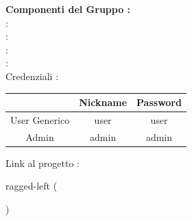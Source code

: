 \documentclass[12pt, a4paper,table]{article}
\begin{document}
\begin{center}
		\vspace{2em}
		\textbf{Componenti del Gruppo :}
		\vspace{0.5em}
		\\ \Tber : \MatT
		\vspace{0.5em}
		\\ \Mspa : \MatM
		\vspace{0.5em}
		\\ \Plau : \MatP
		\vspace{0.5em}
		\\ \Amat : \MatA
    \vspace{0.5em}
    \\ Credenziali :
    \begin{center}
      \begin{tabular}{ |c|c|c| } 
      \hline
      & Nickname & Password \\
      \hline
      User Generico & user & user\\ 
      \hline
      Admin & admin & admin \\ 
      \hline
      \end{tabular}
    \end{center}
    \vspace{0.5em}
    Link al progetto : 

    
	\end{center}

  \newpage
  \tableofcontents
  ragged-left ( \raggedright )
	\newpage
	
	
	\newpage
	
		
	
	
	
	
	
	
	
	
	

  
\end{document}
